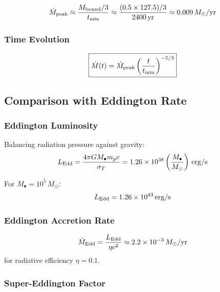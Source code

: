 \documentclass[twocolumn,amsmath,amssymb,prd,superscriptaddress,nofootinbib]{revtex4-2}
\begin{document}
\begin{equation}
    \dot{M}_{\rm peak} \approx \frac{M_{\rm bound}/3}{t_{\rm min}} \approx \frac{(0.5 \times 127.5)/3}{2400\,{\rm yr}} \approx 0.009\,M_\odot/{\rm yr}
    \label{eq:Mdot_peak}
\end{equation}

\subsubsection{Time Evolution}

\begin{equation}
    \boxed{\dot{M}(t) = \dot{M}_{\rm peak}\left(\frac{t}{t_{\rm min}}\right)^{-5/3}}
    \label{eq:Mdot_t}
\end{equation}

\subsection{Comparison with Eddington Rate}
\label{sec:eddington}

\subsubsection{Eddington Luminosity}

Balancing radiation pressure against gravity:
\begin{equation}
    L_{\rm Edd} = \frac{4\pi GM_\bullet m_p c}{\sigma_T} = 1.26 \times 10^{38}\left(\frac{M_\bullet}{M_\odot}\right)\,{\rm erg/s}
    \label{eq:L_Edd}
\end{equation}

For $M_\bullet = 10^5\,M_\odot$:
\begin{equation}
    L_{\rm Edd} = 1.26 \times 10^{43}\,{\rm erg/s}
\end{equation}

\subsubsection{Eddington Accretion Rate}

\begin{equation}
    \dot{M}_{\rm Edd} = \frac{L_{\rm Edd}}{\eta c^2} \approx 2.2 \times 10^{-3}\,M_\odot/{\rm yr}
    \label{eq:Mdot_Edd}
\end{equation}
for radiative efficiency $\eta = 0.1$.

\subsubsection{Super-Eddington Factor}
\end{document}

